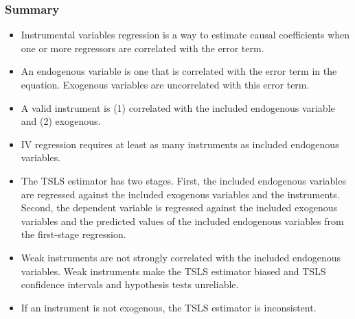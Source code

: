 

\begin{frame}
\frametitle{Summary}
\begin{itemize}
\item Instrumental variables regression is a way to estimate causal coefficients when one or more regressors are correlated with the error term.
\item An endogenous variable is one that is correlated with the error term in the equation. Exogenous variables are uncorrelated with this error term.
\item A valid instrument is (1) correlated with the included endogenous variable and (2) exogenous.
\item IV regression requires at least as many instruments as included endogenous variables.
\item The TSLS estimator has two stages. First, the included endogenous variables are regressed against the included exogenous variables and the instruments. Second, the dependent variable is regressed against the included exogenous variables and the predicted values of the included endogenous variables from the first-stage regression.
\item Weak instruments are not strongly correlated with the included endogenous variables. Weak instruments make the TSLS estimator biased and TSLS confidence intervals and hypothesis tests unreliable.
\item If an instrument is not exogenous, the TSLS estimator is inconsistent.
\end{itemize}
\end{frame}


